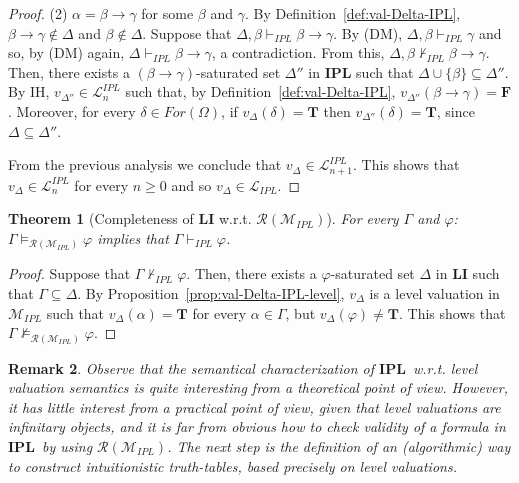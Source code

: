 \documentclass[12pt]{article}
\newtheorem{theorem}{Theorem}[section]
\newtheorem{remark}[theorem]{Remark}
\newcommand{\bT}{\mathbf{T}}
\newcommand{\bF}{\mathbf{F}}
\newcommand{\ipl}{\ensuremath{\mathbf{IPL}}}
\begin{document}
\begin{proof}
(2) $\alpha =\beta \to \gamma$ for some $\beta$ and $\gamma$. By Definition~\ref{def:val-Delta-IPL}, $\beta \to \gamma \not\in \Delta$ and  $\beta \not\in \Delta$. Suppose that $\Delta,\beta \vdash_{IPL} \beta \to \gamma$. By (DM),  $\Delta,\beta \vdash_{IPL} \gamma$ and so, by (DM) again,  $\Delta \vdash_{IPL} \beta \to \gamma$, a contradiction. From this, $\Delta,\beta \nvdash_{IPL} \beta \to \gamma$. Then, there exists a $(\beta \to \gamma)$-saturated set $\Delta''$ in \textbf{IPL} such that $\Delta \cup \{\beta\} \subseteq \Delta''$. By IH, $v_{\Delta''} \in  \mathcal{L}^{IPL}_n$ such that, by Definition~\ref{def:val-Delta-IPL}, $v_{\Delta''}(\beta \to \gamma)=\bF$. Moreover, for every $\delta \in  For(\Omega)$, if $v_\Delta(\delta)=\bT$ then  $v_{\Delta''}(\delta)=\bT$, since $\Delta \subseteq \Delta''$.

From the previous analysis we conclude that  $v_\Delta \in \mathcal{L}^{IPL}_{n+1}$. This shows that $v_\Delta \in \mathcal{L}^{IPL}_{n}$ for every $n \geq 0$ and so  $v_\Delta \in \mathcal{L}_{IPL}$.
\end{proof}

\begin{theorem}  [Completeness  of {\bf LI} w.r.t.  $\mathcal{R}(\mathcal{M}_{IPL})$] \label{thm:compl:IPL}
For every $\Gamma$ and $\varphi$: $\Gamma  \models_{\mathcal{R}(\mathcal{M}_{IPL})} \varphi$ implies that  $\Gamma \vdash_{IPL} \varphi$.
\end{theorem}
\begin{proof}
Suppose that $\Gamma \nvdash_{IPL} \varphi$. Then, there exists a $\varphi$-saturated set $\Delta$ in {\bf LI} such that $\Gamma \subseteq \Delta$. By Proposition~\ref{prop:val-Delta-IPL-level}, $v_\Delta$ is a  level valuation in $\mathcal{M}_{IPL}$ such that $v_\Delta(\alpha)=\bT$ for every $\alpha \in \Gamma$, but $v_\Delta(\varphi)\neq \bT$. This shows that  $\Gamma  \not\models_{ \mathcal{R}(\mathcal{M}_{IPL})} \varphi$.
\end{proof}

\begin{remark} \label{rem:level-val}
Observe that the semantical characterization of \ipl\ w.r.t. level valuation semantics is quite interesting from a theoretical point of view. However, it has little interest from a practical point of view, given that level valuations are infinitary objects, and it is far from obvious how to check validity of a formula in \ipl\ by using $\mathcal{R}(\mathcal{M}_{IPL})$. The next step is the definition of an (algorithmic) way to construct {\em intuitionistic truth-tables}, based precisely on level valuations.
\end{remark}
\end{document}

